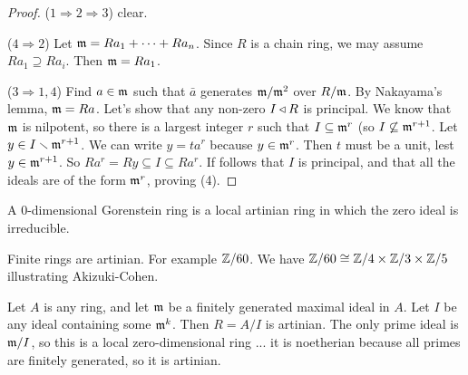  \begin{proof}
   ($1\Rightarrow 2\Rightarrow 3$) clear.

   ($4\Rightarrow 2$) Let $\mathfrak{m}=Ra_1+\cdots + Ra_n$. Since $R$ is a chain ring, we may
   assume $Ra_1\supseteq Ra_i$. Then $\mathfrak{m} = Ra_1$.

   ($3\Rightarrow 1,4$) Find $a\in \mathfrak{m}$ such that $\bar a$ generates $\mathfrak{m}/\mathfrak{m}^2$ over
   $R/\mathfrak{m}$. By Nakayama's lemma, $\mathfrak{m} = Ra$. Let's show that any non-zero $I\triangleleft R$ is
   principal. We know that $\mathfrak{m}$ is nilpotent, so there is a largest integer $r$ such that
   $I\subseteq \mathfrak{m}^r$ (so $I\not\subseteq \mathfrak{m}^{r+1}$. Let $y\in I\smallsetminus \mathfrak{m}^{r+1}$.
   We can write $y=ta^r$ because $y\in \mathfrak{m}^r$. Then $t$ must be a unit, lest $y\in
   \mathfrak{m}^{r+1}$. So $Ra^r=Ry\subseteq I\subseteq Ra^r$. If follows that $I$ is principal,
   and that all the ideals are of the form $\mathfrak{m}^r$, proving (4).
 \end{proof}
 \begin{definition}
   A 0-dimensional Gorenstein ring is a local artinian ring in which the zero ideal is
   irreducible.
 \end{definition}
 \begin{example}
   Finite rings are artinian. For example $\mathbb{Z}/60$. We have $\mathbb{Z}/60\cong \mathbb{Z}/4\times
   \mathbb{Z}/3\times \mathbb{Z}/5$ illustrating Akizuki-Cohen.
 \end{example}
 \begin{example}
   Let $A$ is any ring, and let $\mathfrak{m}$ be a finitely generated maximal ideal in $A$. Let
   $I$ be any ideal containing some $\mathfrak{m}^k$. Then $R=A/I$ is artinian. The only prime
   ideal is $\mathfrak{m}/I$, so this is a local zero-dimensional ring ... it is noetherian because
   all primes are finitely generated, so it is artinian.
 \end{example}
